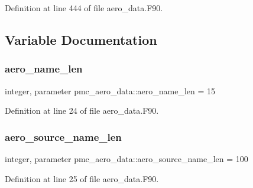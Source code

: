Definition at line 444 of file aero\+\_\+data.\+F90.



\subsection{Variable Documentation}
\mbox{\label{namespacepmc__aero__data_a05ba86cdbb1bbbacbbc41cce6eba6474}} 
\subsubsection{\texorpdfstring{aero\+\_\+name\+\_\+len}{aero\_name\_len}}
{\footnotesize\ttfamily integer, parameter pmc\+\_\+aero\+\_\+data\+::aero\+\_\+name\+\_\+len = 15}



Definition at line 24 of file aero\+\_\+data.\+F90.

\mbox{\label{namespacepmc__aero__data_adceb28b9bf685995bdcb53cacb52ee42}} 
\subsubsection{\texorpdfstring{aero\+\_\+source\+\_\+name\+\_\+len}{aero\_source\_name\_len}}
{\footnotesize\ttfamily integer, parameter pmc\+\_\+aero\+\_\+data\+::aero\+\_\+source\+\_\+name\+\_\+len = 100}



Definition at line 25 of file aero\+\_\+data.\+F90.

